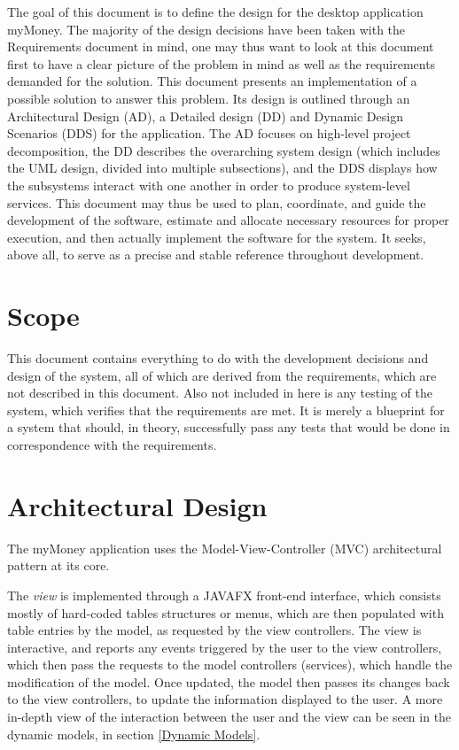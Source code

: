 \documentclass[12pt]{article}
\begin{document}
The goal of this document is to define the design for the desktop application myMoney. The majority of the design decisions have been taken     with the Requirements document in mind, one may thus want to look at this document first to have a clear picture of the problem in mind as well as the requirements demanded for the solution. This document presents an implementation of a possible solution to answer this problem. Its design is outlined through an Architectural Design (AD), a Detailed design (DD) and Dynamic Design Scenarios (DDS) for the application. The AD focuses on high-level project decomposition, the DD describes the overarching system design (which includes the UML design, divided into multiple subsections), and the DDS displays how the subsystems interact with one another in order to produce system-level services. This document may thus be used to plan, coordinate, and guide the development of the software, estimate and allocate necessary resources for proper execution, and  then actually implement the software for the system. It seeks, above all, to serve as a precise and stable reference throughout development.

\section{Scope}

This document contains everything to do with the development decisions and design of the system, all of which are derived from the requirements, which are not described in this document. Also not included in here is any testing of the system, which verifies that the requirements are met. It is merely a blueprint for a system that should, in theory, successfully pass any tests that would be done in correspondence with the requirements.

\section{Architectural Design} \label{sec:arch}

The myMoney application uses the Model-View-Controller (MVC) architectural pattern at its core.

The \textit{view} is implemented through a JAVAFX front-end interface, which consists mostly of hard-coded tables structures or menus, which are then populated with table entries by the model, as requested by the view controllers. The view is interactive, and reports any events triggered by the user to the view controllers, which then pass the requests to the model controllers (services), which handle the modification of the model. Once updated, the model then passes its changes back to the view controllers, to update the information displayed to the user. A more in-depth view of the interaction between the user and the view can be seen in the dynamic models, in section \ref{Dynamic Models}.
\end{document}
